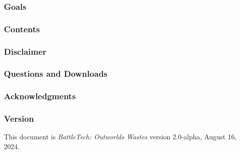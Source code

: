 

\subsubsection*{Goals}



\subsubsection*{Contents}



\subsubsection*{Disclaimer}



\subsubsection*{Questions and Downloads}



\subsubsection*{Acknowledgments}



\subsubsection*{Version}

This document is \emph{BattleTech: Outworlds Wastes} version 2.0-alpha, August 16, 2024.

\newpage

\vspace*{\fill}

\vspace*{\fill}
